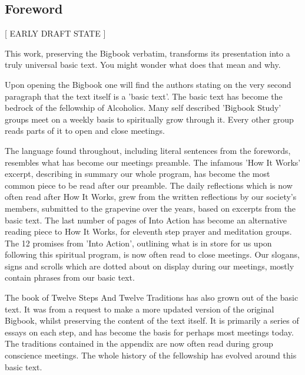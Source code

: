 \begin{fmatterchapter}

\chapter*{Foreword}

\begin{center}[ EARLY DRAFT STATE ]\end{center}

This work, preserving the Bigbook verbatim, 
    transforms its presentation 
    into a truly universal basic text.
You might wonder what does that mean and why.

Upon opening the Bigbook 
    one will find the authors stating on the very second paragraph 
    that the text itself is a 'basic text'.
The basic text has become the bedrock of the fellowship of Alcoholics.
Many self described 'Bigbook Study' groups 
    meet on a weekly basis to spiritually grow through it.
Every other group reads parts of it to open and close meetings.

The language found throughout, 
    including literal sentences from the forewords, 
    resembles what has become our meetings preamble.
The infamous 'How It Works' excerpt, 
    describing in summary our whole program, 
    has become the most common piece to be read after our preamble.
The daily reflections which is now often read after How It Works, 
    grew from the written reflections by our society's members, 
    submitted to the grapevine over the years, 
    based on excerpts from the basic text.
The last number of pages of Into Action 
    has become an alternative reading piece to How It Works,
    for eleventh step prayer and meditation groups.
The 12 promises from 'Into Action', 
    outlining what is in store for us upon following this spiritual program, 
    is now often read to close meetings.
Our slogans, signs and scrolls which are dotted about on display 
    during our meetings,
    mostly contain phrases from our basic text.

The book of Twelve Steps And Twelve Traditions 
    has also grown out of the basic text.
It was from a request to make a more updated version of the original Bigbook, whilst preserving the content of the text itself.
It is primarily a series of essays on each step, 
    and has become the basis for perhaps most meetings today.
The traditions contained in the appendix 
    are now often read during group conscience meetings.
The whole history of the fellowship has evolved around this basic text.


\end{fmatterchapter}
